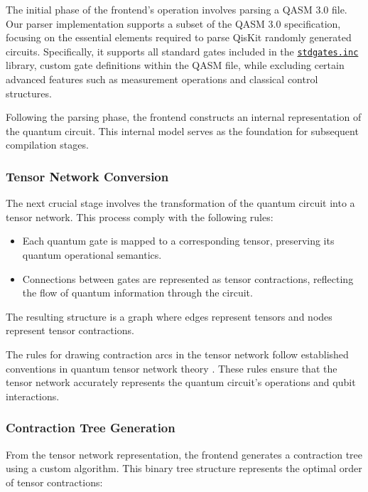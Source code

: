 \documentclass[12pt,oneside,a4paper]{article}
\begin{document}
The initial phase of the frontend's operation involves parsing a QASM 3.0\cite{cross2017openquantumassemblylanguage} file. Our parser implementation supports a subset of the QASM 3.0 specification, focusing on the essential elements required to parse QisKit\cite{qiskit2024} randomly generated circuits. Specifically, it supports all standard gates included in the \href{https://github.com/Qiskit/qiskit/blob/main/qiskit/qasm/libs/stdgates.inc}{\texttt{stdgates.inc}} library, custom gate definitions within the QASM file, while excluding certain advanced features such as measurement operations and classical control structures.

Following the parsing phase, the frontend constructs an internal representation of the quantum circuit. This internal model serves as the foundation for subsequent compilation stages.

\subsubsection{Tensor Network Conversion}

The next crucial stage involves the transformation of the quantum circuit into a tensor network. This process comply with the following rules:

\begin{itemize}
    \item Each quantum gate is mapped to a corresponding tensor, preserving its quantum operational semantics.
    \item Connections between gates are represented as tensor contractions, reflecting the flow of quantum information through the circuit.
\end{itemize}

The resulting structure is a graph where edges represent tensors and nodes represent tensor contractions.

The rules for drawing contraction arcs in the tensor network follow established conventions in quantum tensor network theory \cite{biamonte2017tensornetworksnutshell}. These rules ensure that the tensor network accurately represents the quantum circuit's operations and qubit interactions.

\subsubsection{Contraction Tree Generation}

From the tensor network representation, the frontend generates a contraction tree using a custom algorithm. This binary tree structure represents the optimal order of tensor contractions:
\end{document}
